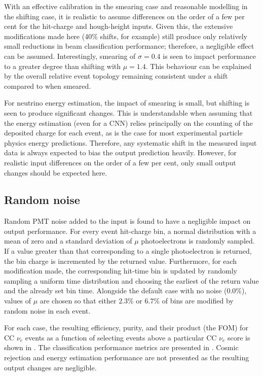 With an effective calibration in the smearing case and reasonable modelling in the shifting case,
it is realistic to assume differences on the order of a few per cent for the hit-charge and
hough-height inputs. Given this, the extensive modifications made here (40\% shifts, for example)
still produce only relatively small reductions in beam classification performance; therefore, a
negligible effect can be assumed. Interestingly, smearing of $\sigma=0.4$ is seen to impact
performance to a greater degree than shifting with $\mu=1.4$. This behaviour can be explained by
the overall relative event topology remaining consistent under a shift compared to when smeared.

For neutrino energy estimation, the impact of smearing is small, but shifting is seen to produce
significant changes. This is understandable when assuming that the energy estimation (even for a
CNN) relies principally on the counting of the deposited charge for each event, as is the case for
most experimental particle physics energy predictions. Therefore, any systematic shift in the
measured input data is always expected to bias the output prediction heavily. However, for
realistic input differences on the order of a few per cent, only small output changes should be
expected here.

\subsection{Random noise} %
\label{sec:results_robust_noise} %

Random PMT noise added to the input is found to have a negligible impact on output performance.
For every event hit-charge bin, a normal distribution with a mean of zero and a standard deviation
of $\mu$ photoelectrons is randomly sampled. If a value greater than that corresponding to a
single photoelectron is returned, the bin charge is incremented by the returned value.
Furthermore, for each modification made, the corresponding hit-time bin is updated by randomly
sampling a uniform time distribution and choosing the earliest of the return value and the already
set bin time. Alongside the default case with no noise ($0.0\%$), values of $\mu$ are chosen so
that either $2.3\%$ or $6.7\%$ of bins are modified by random noise in each event.

For each case, the resulting efficiency, purity, and their product (the FOM) for CC $\nu_{e}$
events as a function of selecting events above a particular CC $\nu_{e}$ score is shown in
. The classification performance metrics are presented
in . Cosmic rejection and energy estimation performance are not presented
as the resulting output changes are negligible.

